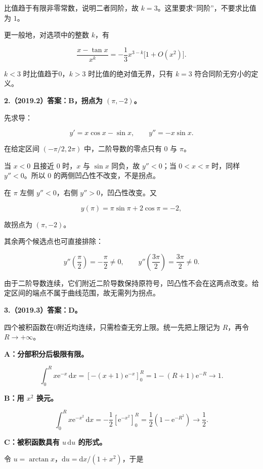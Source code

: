 \documentclass[UTF8,11pt,fontset=windows]{ctexart}
\begin{document}
比值趋于有限非零常数，说明二者同阶，故 $k=3$。这里要求“同阶”，不要求比值为 $1$。

更一般地，对选项中的整数 $k$，有

$$
\frac{x-\tan x}{x^k}=-\frac13x^{3-k}\bigl[1+O(x^2)\bigr].
$$

$k<3$ 时比值趋于0，$k>3$ 时比值的绝对值无界，只有 $k=3$ 符合同阶无穷小的定义。

\clearpage

\textbf{2.（2019.2）答案：B，拐点为 $(\pi,-2)$。}

先求导：

$$
y'=x\cos x-\sin x,
\qquad y''=-x\sin x.
$$

在给定区间 $(-\pi/2,2\pi)$ 中，二阶导数的零点只有 $0$ 与 $\pi$。

当 $x<0$ 且接近 $0$ 时，$x$ 与 $\sin x$ 同负，故 $y''<0$；当 $0<x<\pi$ 时，同样 $y''<0$。所以 $0$ 的两侧凹凸性不改变，不是拐点。

在 $\pi$ 左侧 $y''<0$，右侧 $y''>0$，凹凸性改变。又

$$
y(\pi)=\pi\sin\pi+2\cos\pi=-2,
$$

故拐点为 $(\pi,-2)$。

其余两个候选点也可直接排除：

$$
y''\!\left(\frac\pi2\right)=-\frac\pi2\ne0,
\qquad
y''\!\left(\frac{3\pi}2\right)=\frac{3\pi}2\ne0.
$$

由于二阶导数连续，它们附近二阶导数保持原符号，凹凸性不会在这两点改变。给定区间的端点不属于曲线范围，故无需列为拐点。

\clearpage

\textbf{3.（2019.3）答案：D。}

四个被积函数在0附近均连续，只需检查无穷上限。统一先把上限记为 $R$，再令 $R\to+\infty$。

\textbf{A：分部积分后极限有限。}

$$
\int_0^R x\mathrm e^{-x}\,\mathrm dx
=\left[-(x+1)\mathrm e^{-x}\right]_0^R
=1-(R+1)\mathrm e^{-R}\longrightarrow1.
$$

\textbf{B：用 $x^2$ 换元。}

$$
\int_0^R x\mathrm e^{-x^2}\,\mathrm dx
=-\frac12\left[\mathrm e^{-x^2}\right]_0^R
=\frac12(1-\mathrm e^{-R^2})\longrightarrow\frac12.
$$

\textbf{C：被积函数具有 $u\,\mathrm du$ 的形式。}

令 $u=\arctan x$，$\mathrm du=\mathrm dx/(1+x^2)$，于是
\end{document}
